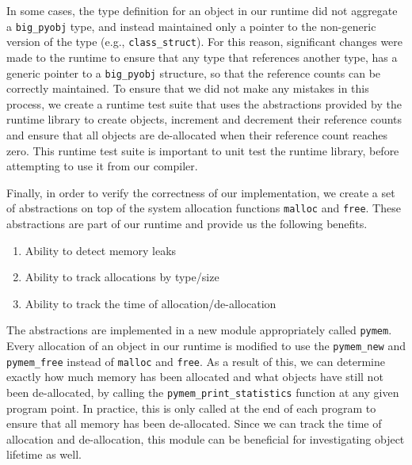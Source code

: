 \documentclass{sigplanconf}
\begin{document}
In some cases, the type definition for an object in our runtime did not aggregate a \texttt{big\_pyobj} type, and instead maintained only a pointer to the non-generic version of the type (e.g., \texttt{class\_struct}).  For this reason, significant changes were made to the runtime to ensure that any type that references another type, has a generic pointer to a \texttt{big\_pyobj} structure, so that the reference counts can be correctly maintained.  To ensure that we did not make any mistakes in this process, we create a runtime test suite that uses the abstractions provided by the runtime library to create objects, increment and decrement their reference counts and ensure that all objects are de-allocated when their reference count reaches zero.  This runtime test suite is important to unit test the runtime library, before attempting to use it from our compiler.

Finally, in order to verify the correctness of our implementation, we create a set of abstractions on top of the system allocation functions \texttt{malloc} and \texttt{free}.  These abstractions are part of our runtime and provide us the following benefits. 

\begin{enumerate}
\item Ability to detect memory leaks
\item Ability to track allocations by type/size
\item Ability to track the time of allocation/de-allocation
\end{enumerate}

The abstractions are implemented in a new module appropriately called \texttt{pymem}.  Every allocation of an object in our runtime is modified to use the \texttt{pymem\_new} and \texttt{pymem\_free} instead of \texttt{malloc} and \texttt{free}. As a result of this, we can determine exactly how much memory has been allocated and what objects have still not been de-allocated, by calling the \texttt{pymem\_print\_statistics} function at any given program point.  In practice, this is only called at the end of each program to ensure that all memory has been de-allocated.  Since we can track the time of allocation and de-allocation, this module can be beneficial for investigating object lifetime as well.  
\end{document}
